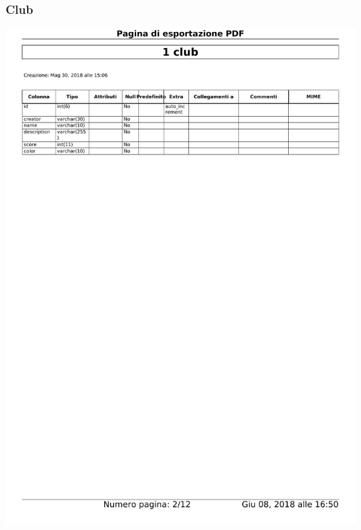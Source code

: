 \documentclass{article}
\begin{document}
    \subsubsection{Club}
    \begin{center}
        \includegraphics[width=15cm]{images/club}
    \end{center} 
\end{document}
